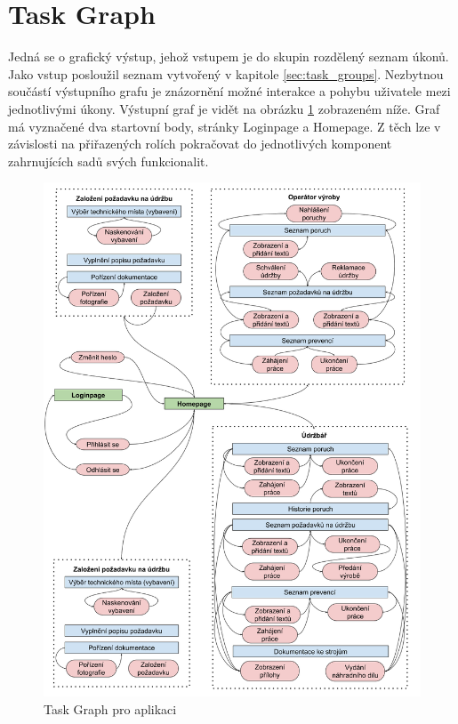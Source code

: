 \documentclass[thesis=M,czech]{FITthesis}[2012/06/26]
\begin{document}
\section{Task Graph}
Jedná se o grafický výstup, jehož vstupem je do skupin rozdělený seznam úkonů. Jako vstup posloužil seznam vytvořený v kapitole \ref{sec:task_groups}. Nezbytnou součástí výstupního grafu je znázornění možné interakce a pohybu uživatele mezi jednotlivými úkony. Výstupní graf je vidět na obrázku \ref{img:task_graph} zobrazeném níže. Graf má vyznačené dva startovní body, stránky Loginpage a Homepage. Z těch lze v závislosti na přiřazených rolích pokračovat do jednotlivých komponent zahrnujících sadů svých funkcionalit.
\begin{figure}[H]
	\centering
	\includegraphics[width=1\textwidth]{images/task_graph.png}
	\caption{Task Graph pro aplikaci}
	\label{img:task_graph}
\end{figure}
\end{document}
